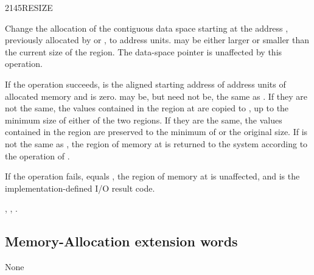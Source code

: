 \begin{worddef}{2145}{RESIZE}
\item {}

	Change the allocation of the contiguous data space starting at
	the address , previously allocated by
	 or , to  address units.
	 may 	be either larger or smaller than the current
	size of the region. The data-space pointer is unaffected by
	this operation.

	If the operation succeeds,  is the aligned
	starting address of  address units of allocated memory
	and  is zero.  may be, but need
	not be, the same as . If they are not the same,
	the values contained in the region at  are copied
	to , up to the minimum size of either of the
	two regions. If they are the same, the values contained in the
	region are preserved to the minimum of  or the original
	size.  If  is not the same as ,
	the region of memory at  is returned to the system
	according to the operation of .

	If the operation fails,  equals ,
	the region of memory at  is unaffected, and
	 is the implementation-defined I/O result code.

\see {},
	,
	.
\end{worddef}


\subsection{Memory-Allocation extension words} %

None
